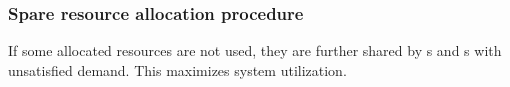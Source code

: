 %

\subsubsection*{Spare resource allocation procedure}
If some allocated resources are not used, they are further shared by {\batchq}s and {\burstq}s with unsatisfied demand. This maximizes system utilization.


